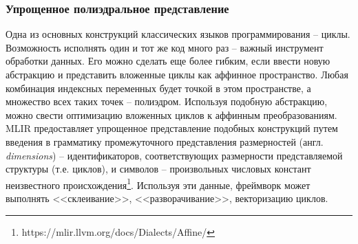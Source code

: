 \subsubsection{Упрощенное полиэдральное представление}
Одна из основных конструкций классических языков программирования -- циклы.
Возможность исполнять один и тот же код много раз -- важный инструмент обработки
данных. Его можно сделать еще более гибким, если ввести новую абстракцию и
представить вложенные циклы как аффинное пространство. Любая комбинация
индексных переменных будет точкой в этом пространстве, а множество всех таких
точек -- полиэдром. Используя подобную абстракцию, можно свести оптимизацию
вложенных циклов к аффинным преобразованиям. MLIR предоставляет упрощенное
представление подобных конструкций путем введения в грамматику промежуточного
представления размерностей (англ. \textit{dimensions}) -- идентификаторов,
соответствующих размерности представляемой структуры (т.е. циклов), и символов --
произвольных числовых констант неизвестного происхождения\footnote{https://mlir.llvm.org/docs/Dialects/Affine/}.
Используя эти данные, фреймворк может выполнять <<склеивание>>,
<<разворачивание>>, векторизацию циклов.
